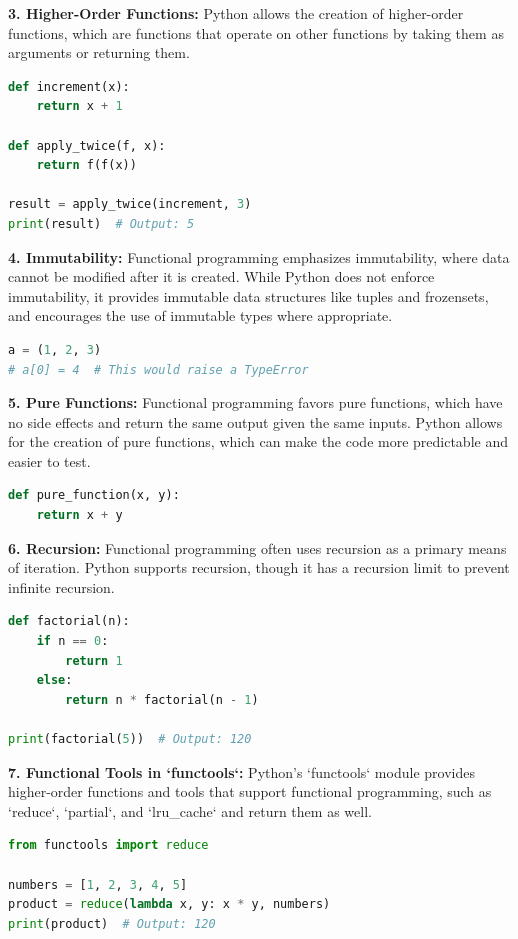 \documentclass[12pt]{article}
\begin{document}
\textbf{3. Higher-Order Functions:} Python allows the creation of higher-order functions, which are functions that operate on other functions by taking them as arguments or returning them.
\begin{lstlisting}[language = Python]
def increment(x):
    return x + 1

def apply_twice(f, x):
    return f(f(x))

result = apply_twice(increment, 3)
print(result)  # Output: 5
\end{lstlisting}

\vspace{0.5cm}

\textbf{4. Immutability:} Functional programming emphasizes immutability, where data cannot be modified after it is created. While Python does not enforce immutability, it provides immutable data structures like tuples and frozensets, and encourages the use of immutable types where appropriate.
\begin{lstlisting}[language = Python]
a = (1, 2, 3)
# a[0] = 4  # This would raise a TypeError
\end{lstlisting}

\vspace{0.5cm}

\textbf{5. Pure Functions:} Functional programming favors pure functions, which have no side effects and return the same output given the same inputs. Python allows for the creation of pure functions, which can make the code more predictable and easier to test.
\begin{lstlisting}[language = Python]
def pure_function(x, y):
    return x + y
\end{lstlisting}

\vspace{0.5cm}

\textbf{6. Recursion:} Functional programming often uses recursion as a primary means of iteration. Python supports recursion, though it has a recursion limit to prevent infinite recursion.
\begin{lstlisting}[language = Python]
def factorial(n):
    if n == 0:
        return 1
    else:
        return n * factorial(n - 1)

print(factorial(5))  # Output: 120
\end{lstlisting}

\vspace{0.5cm}

\textbf{7. Functional Tools in `functools`: } Python’s `functools` module provides higher-order functions and tools that support functional programming, such as `reduce`, `partial`, and `lru\_cache` and return them as well.
\begin{lstlisting}[language = Python]
from functools import reduce

numbers = [1, 2, 3, 4, 5]
product = reduce(lambda x, y: x * y, numbers)
print(product)  # Output: 120
\end{lstlisting}
\end{document}
